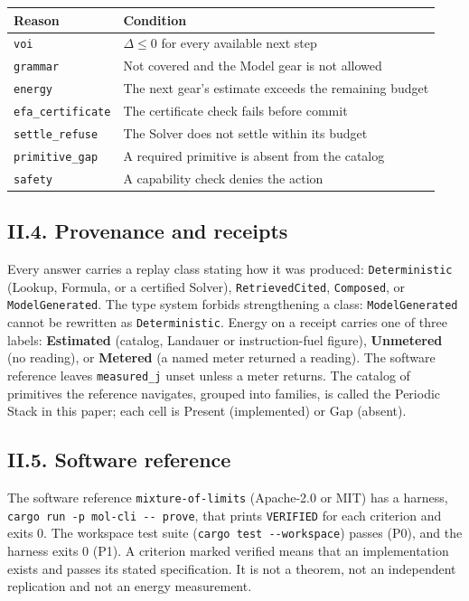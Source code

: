 \documentclass[
  10pt,
]{article}
\newcounter{none} %
\begin{document}
{\def\LTcaptype{none} %
\begin{longtable}[]{@{}ll@{}}
\toprule\noalign{}
Reason & Condition \\
\midrule\noalign{}
\endhead
\bottomrule\noalign{}
\endlastfoot
\texttt{voi} & \(\Delta \le 0\) for every available next step \\
\texttt{grammar} & Not covered and the Model gear is not allowed \\
\texttt{energy} & The next gear's estimate exceeds the remaining
budget \\
\texttt{efa\_certificate} & The certificate check fails before commit \\
\texttt{settle\_refuse} & The Solver does not settle within its
budget \\
\texttt{primitive\_gap} & A required primitive is absent from the
catalog \\
\texttt{safety} & A capability check denies the action \\
\end{longtable}
}

\subsection{II.4. Provenance and
receipts}\label{ii.4.-provenance-and-receipts}

Every answer carries a replay class stating how it was produced:
\texttt{Deterministic} (Lookup, Formula, or a certified Solver),
\texttt{RetrievedCited}, \texttt{Composed}, or \texttt{ModelGenerated}.
The type system forbids strengthening a class: \texttt{ModelGenerated}
cannot be rewritten as \texttt{Deterministic}. Energy on a receipt
carries one of three labels: \textbf{Estimated} (catalog, Landauer or
instruction-fuel figure), \textbf{Unmetered} (no reading), or
\textbf{Metered} (a named meter returned a reading). The software
reference leaves \texttt{measured\_j} unset unless a meter returns. The
catalog of primitives the reference navigates, grouped into families, is
called the Periodic Stack in this paper; each cell is Present
(implemented) or Gap (absent).

\subsection{II.5. Software reference}\label{ii.5.-software-reference}

The software reference \texttt{mixture-of-limits} (Apache-2.0 or MIT)
has a harness, \texttt{cargo\ run\ -p\ mol-cli\ -\/-\ prove}, that
prints \texttt{VERIFIED} for each criterion and exits 0. The workspace
test suite (\texttt{cargo\ test\ -\/-workspace}) passes (P0), and the
harness exits 0 (P1). A criterion marked verified means that an
implementation exists and passes its stated specification. It is not a
theorem, not an independent replication and not an energy measurement.
\end{document}
